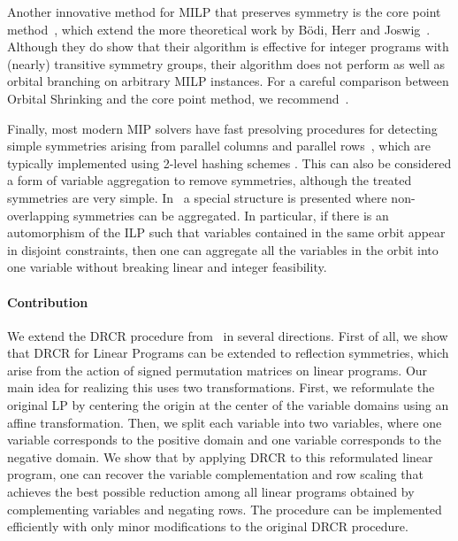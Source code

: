 \documentclass[pdflatex,sn-mathphys-num]{sn-jnl}%
\theoremstyle{thmstyleone}%
\theoremstyle{thmstylethree}%
\theoremstyle{thmstyletwo}%
\begin{document}
Another innovative method for MILP that preserves symmetry is the core point method~\cite{Herr2013}, which extend the more theoretical work by B{\"o}di, Herr and Joswig~\cite{Bodi2013}. Although they do show that their algorithm is effective for integer programs with (nearly) transitive symmetry groups, their algorithm does not perform as well as orbital branching on arbitrary MILP instances. For a careful comparison between Orbital Shrinking and the core point method, we recommend~\cite[section 3]{Fischetti2017}.

Finally, most modern MIP solvers have fast presolving procedures for detecting simple symmetries arising from parallel columns and parallel rows~\cite{Achterberg2016}, which are typically implemented using 2-level hashing schemes \cite{Achterberg2016,Gemander2020}. This can also be considered a form of variable aggregation to remove symmetries, although the treated symmetries are very simple. In~\cite[Section 7.1]{Achterberg2016} a special structure is presented where non-overlapping symmetries  can be aggregated. In particular, if there is an automorphism of the ILP such that variables contained in the same orbit appear in disjoint constraints, then one can aggregate all the variables in the orbit into one variable without breaking linear and integer feasibility.

\paragraph{Contribution}
We extend the DRCR procedure from~\cite{Grohe2014} in several directions. First of all, we show that DRCR for Linear Programs can be extended to reflection symmetries, which arise from the action of signed permutation matrices on linear programs. Our main idea for realizing this uses two transformations. First, we reformulate the original LP by centering the origin at the center of the variable domains using an affine transformation. Then, we split each variable into two variables, where one variable corresponds to the positive domain and one variable corresponds to the negative domain. We show that by applying DRCR to this reformulated linear program, one can recover the variable complementation and row scaling that achieves the best possible reduction among all linear programs obtained by complementing variables and negating rows. The procedure can be implemented efficiently with only minor modifications to the original DRCR procedure.
\\
\end{document}
